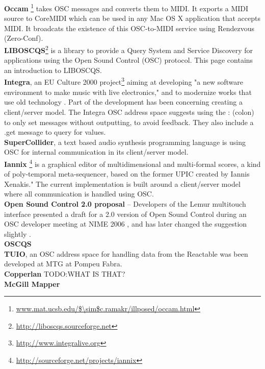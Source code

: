 \documentclass{sig-alternate}
\begin{document}
\noindent \textbf{Occam} \footnote{\url{www.mat.ucsb.edu/$\sim$c.ramakr/illposed/occam.html}} takes OSC messages and converts them to MIDI. It exports a MIDI source to CoreMIDI which can be used in any Mac OS X application that accepts MIDI. It broadcats the existence of this OSC-to-MIDI service using Rendezvous (Zero-Conf).\\    
\textbf{LIBOSCQS}\footnote{\url{http://liboscqs.sourceforge.net}} is a library to provide a Query System and Service Discovery for applications using the Open Sound Control (OSC) protocol\cite{Schmeder:2004oscqs}. This page contains an introduction to LIBOSCQS. \\
\textbf{Integra}, an EU Culture 2000 project\footnote{\url{http://www.integralive.org}}  aiming at developing "a new software environment to make music with live electronics," and to modernize works that use old technology \cite{Bullock:2007}. Part of the development has been concerning creating a client/server model.  The Integra OSC address space suggests using the : (colon) to only set messages without outputting, to avoid feedback. They also include a .get message to query for values.\\ 
\textbf{SuperCollider}, a text based audio synthesis programming language is using OSC for internal communication in its client/server model.\\ 
\textbf{Iannix} \footnote{\url{http://sourceforge.net/projects/iannix}} is a graphical editor of 
multidimensional and multi-formal scores, a kind of poly-temporal meta-sequencer, based on the former UPIC created by Iannis Xenakis." The current implementation is built around a client/server model where all communication is handled using OSC. \cite{Coduys:2004}\\
\textbf{Open Sound Control 2.0 proposal} -- Developers of the Lemur multitouch interface presented a draft for a 2.0 version of Open Sound Control during an OSC developer meeting at 
NIME 2006 \cite{Jazzmutant:2006}, and has later changed the suggestion slightly \cite{Jazzmutant:2007}.\\ 
\textbf{OSCQS} \cite{Habets:2005}\\
\textbf{TUIO}, an OSC address space for handling data from the Reactable \cite{Kaltenbrunner:2005} was been developed at MTG at Pompeu Fabra.\\
\textbf{Copperlan} TODO:WHAT IS THAT?\\
\textbf{McGill Mapper} \cite{Malloch:2007}\\
\end{document}
